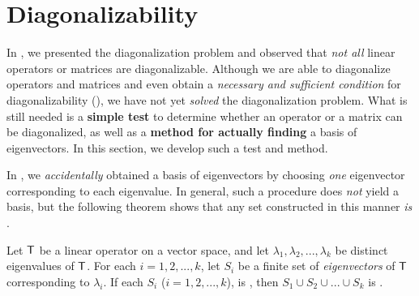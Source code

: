 \section{Diagonalizability} \label{sec 5.2}

In , we presented the diagonalization problem and observed that \emph{not all} linear operators or matrices are diagonalizable.
Although we are able to diagonalize operators and matrices and even obtain a \emph{necessary and sufficient condition} for diagonalizability (),
we have not yet \emph{solved} the diagonalization problem.
What is still needed is a \textbf{simple test} to determine whether an operator or a matrix can be diagonalized, as well as a \textbf{method for actually finding} a basis of eigenvectors.
In this section, we develop such a test and method.

In , we \emph{accidentally} obtained a basis of eigenvectors by choosing \emph{one} eigenvector corresponding to each eigenvalue.
In general, such a procedure does \emph{not} yield a basis, but the following theorem shows that any set constructed in this manner \emph{is \LID{}}.

\begin{theorem} \label{thm 5.5}
Let \(\textsf{T}\) be a linear operator on a vector space, and let \(\lambda_1, \lambda_2, ..., \lambda_k\) be distinct eigenvalues of \(\textsf{T}\).
For each \(i = 1, 2, ..., k\), let \(S_i\) be a finite set of \emph{eigenvectors} of \(\textsf{T}\) corresponding to \(\lambda_i\).
If each \(S_i\) (\(i = 1, 2, ..., k\)), is \LID{}, then \(S_1 \cup S_2 \cup ... \cup S_k\) is \LID{}.
\end{theorem}


